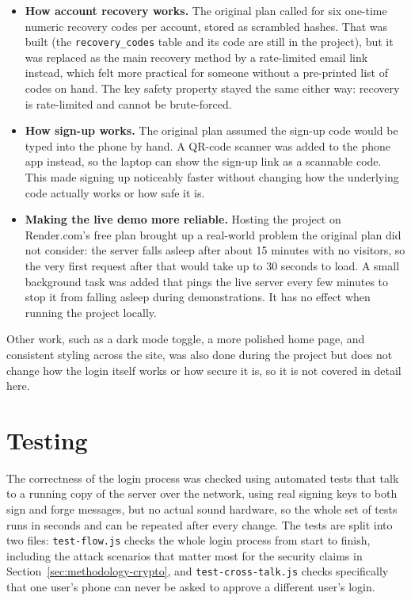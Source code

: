 \begin{itemize}
  \item \textbf{How account recovery works.} The original plan called for
  six one-time numeric recovery codes per account, stored as scrambled
  hashes. That was built (the \texttt{recovery\_codes} table and its code
  are still in the project), but it was replaced as the main recovery
  method by a rate-limited email link instead, which felt more practical
  for someone without a pre-printed list of codes on hand. The key safety
  property stayed the same either way: recovery is rate-limited and cannot
  be brute-forced.
  \item \textbf{How sign-up works.} The original plan assumed the sign-up
  code would be typed into the phone by hand. A QR-code scanner was added
  to the phone app instead, so the laptop can show the sign-up link as a
  scannable code. This made signing up noticeably faster without changing
  how the underlying code actually works or how safe it is.
  \item \textbf{Making the live demo more reliable.} Hosting the project
  on Render.com's free plan brought up a real-world problem the original
  plan did not consider: the server falls asleep after about 15 minutes
  with no visitors, so the very first request after that would take up to
  30 seconds to load. A small background task was added that pings the
  live server every few minutes to stop it from falling asleep during
  demonstrations. It has no effect when running the project locally.
\end{itemize}

Other work, such as a dark mode toggle, a more polished home page, and
consistent styling across the site, was also done during the project but
does not change how the login itself works or how secure it is, so it is
not covered in detail here.

\section{Testing}
\label{sec:testing}

The correctness of the login process was checked using automated tests
that talk to a running copy of the server over the network, using real
signing keys to both sign and forge messages, but no actual sound
hardware, so the whole set of tests runs in seconds and can be repeated
after every change. The tests are split into two files:
\texttt{test-flow.js} checks the whole login process from start to
finish, including the attack scenarios that matter most for the security
claims in Section~\ref{sec:methodology-crypto}, and
\texttt{test-cross-talk.js} checks specifically that one user's phone can
never be asked to approve a different user's login.

